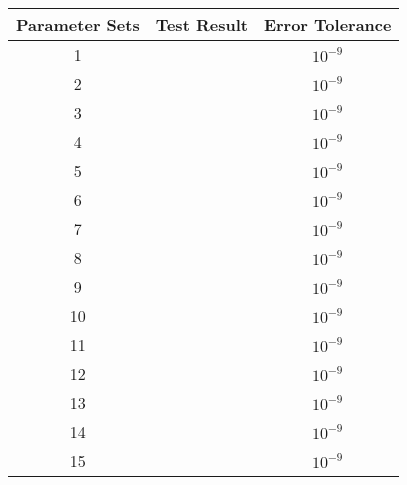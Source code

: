 \begin{center}
	\begin{tabular}{|c|c|c|}
		\hline
		Parameter Sets & Test Result & Error Tolerance \\ \hline \hline
		1  & & $10^{-9}$ \\ \hline
		2  & & $10^{-9}$ \\ \hline
		3  & & $10^{-9}$ \\ \hline
		4  && $10^{-9}$ \\ \hline
		5  && $10^{-9}$ \\ \hline
		6  &  & $10^{-9}$ \\ \hline
		7  && $10^{-9}$ \\ \hline
		8  & & $10^{-9}$ \\ \hline
		9  & & $10^{-9}$ \\ \hline
		10  && $10^{-9}$ \\ \hline
		11  & & $10^{-9}$ \\ \hline
		12  & & $10^{-9}$ \\ \hline
		13 & & $10^{-9}$ \\ \hline
		14 & & $10^{-9}$ \\ \hline
		15 & & $10^{-9}$ \\
		\hline

	\end{tabular}
\end{center}

